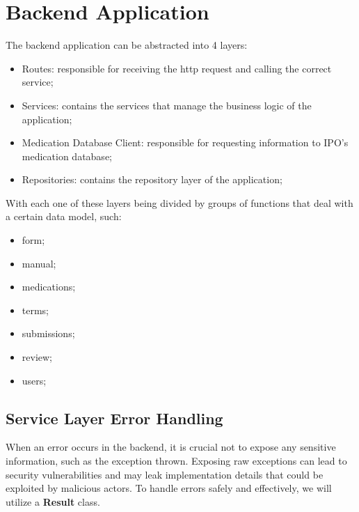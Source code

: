 \section{Backend Application}

The backend application can be abstracted into 4 layers:
\begin{itemize}
	\item Routes: responsible for receiving the http request and calling the correct service;
	\item Services: contains the services that manage the business logic of the application;
	\item Medication Database Client: responsible for requesting information to IPO's medication database;
	\item Repositories: contains the repository layer of the application;
\end{itemize}

With each one of these layers being divided by groups of functions that deal with a certain data model, such:
\begin{itemize}
	\item form;
	\item manual;
	\item medications;
	\item terms;
	\item submissions;
	\item review;
	\item users;
\end{itemize}

\subsection{Service Layer Error Handling}\label{service_layer_error_handling}

When an error occurs in the backend, it is crucial not to expose any sensitive information, such as the exception thrown. Exposing raw exceptions can lead to security vulnerabilities and may leak implementation details that could be exploited by malicious actors. To handle errors safely and effectively, we will utilize a \textbf{Result} class.


